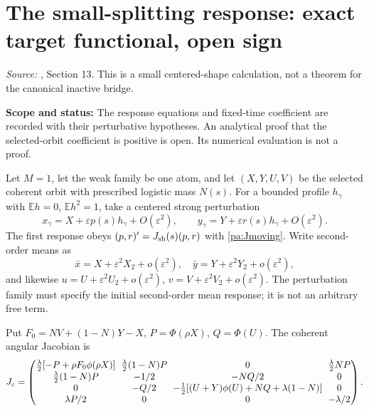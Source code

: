 \documentclass[11pt]{article}
\numberwithin{equation}{section}
\theoremstyle{definition}
\theoremstyle{remark}
\newcommand{\E}{\mathbb E}
\newcommand{\1}{\mathbf 1}
\newcommand{\scope}[1]{\par\noindent\textbf{Scope and status:} #1\par\smallskip}
\newcommand{\source}[1]{\par\noindent\textit{Source:} #1\par\smallskip}
\begin{document}
\section{The small-splitting response: exact target functional, open sign}
\label{pa:response}
\source{\cite{SP}, Section 13. This is a small centered-shape calculation,
not a theorem for the canonical inactive bridge.}
\scope{The response equations and fixed-time coefficient are recorded with
their perturbative hypotheses. An analytical proof that the selected-orbit
coefficient is positive is open. Its numerical evaluation is not a proof.}

Let $M=1$, let the weak family be one atom, and let $(X,Y,U,V)$ be the
selected coherent orbit with prescribed logistic mass $N(s)$. For a bounded
profile $h_\gamma$ with $\E h=0$, $\E h^2=1$, take a centered strong
perturbation
\[
 x_\gamma=X+\varepsilon p(s)h_\gamma+O(\varepsilon^2),\qquad
 y_\gamma=Y+\varepsilon r(s)h_\gamma+O(\varepsilon^2).
\]
The first response obeys $(p,r)'=J_{\rm sh}(s)(p,r)$ with
\eqref{pa:Jmoving}. Write second-order means as
\[
 \bar x=X+\varepsilon^2X_2+o(\varepsilon^2),\quad
 \bar y=Y+\varepsilon^2Y_2+o(\varepsilon^2),
\]
and likewise $u=U+\varepsilon^2U_2+o(\varepsilon^2)$,
$v=V+\varepsilon^2V_2+o(\varepsilon^2)$. The perturbation family must specify
the initial second-order mean response; it is not an arbitrary free term.

Put $F_0=NV+(1-N)Y-X$, $P=\Phi(\rho X)$, $Q=\Phi(U)$. The coherent
angular Jacobian is
\begin{equation}\label{pa:Jresponse}
\setlength{\arraycolsep}{3pt}
 J_c=\begin{pmatrix}
 \frac\lambda2[-P+\rho F_0\phi(\rho X)]&\frac\lambda2(1-N)P&0&\frac\lambda2NP\\
 \frac\lambda2(1-N)P&-1/2&-NQ/2&0\\
 0&-Q/2&-\frac12[(U+Y)\phi(U)+NQ+\lambda(1-N)]&0\\
 \lambda P/2&0&0&-\lambda/2
 \end{pmatrix}.
\end{equation}
\end{document}
